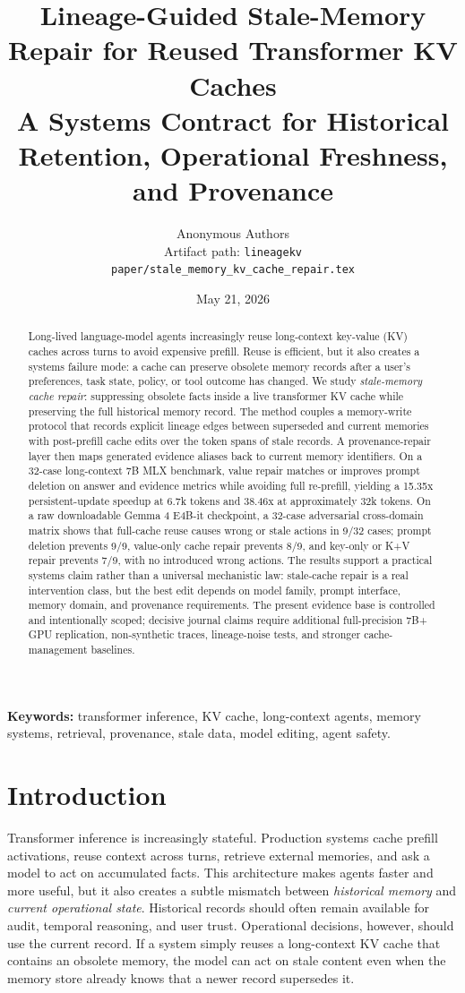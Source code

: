 \documentclass[11pt]{article}
\title{\textbf{Lineage-Guided Stale-Memory Repair for Reused Transformer KV Caches}\\
\large A Systems Contract for Historical Retention, Operational Freshness, and Provenance}
\author{
Anonymous Authors\\
Artifact path: \texttt{lineagekv}\\
\texttt{paper/stale\_memory\_kv\_cache\_repair.tex}
}
\date{May 21, 2026}
\newcommand{\gemma}{Gemma 4 E4B-it}
\begin{document}
\maketitle

\begin{abstract}
Long-lived language-model agents increasingly reuse long-context key-value (KV)
caches across turns to avoid expensive prefill. Reuse is efficient, but it also
creates a systems failure mode: a cache can preserve obsolete memory records
after a user's preferences, task state, policy, or tool outcome has changed. We
study \emph{stale-memory cache repair}: suppressing obsolete facts inside a
live transformer KV cache while preserving the full historical memory record.
The method couples a memory-write protocol that records explicit lineage edges
between superseded and current memories with post-prefill cache edits over the
token spans of stale records. A provenance-repair layer then maps generated
evidence aliases back to current memory identifiers. On a 32-case long-context
7B MLX benchmark, value repair matches or improves prompt deletion on answer
and evidence metrics while avoiding full re-prefill, yielding a 15.35x
persistent-update speedup at 6.7k tokens and 38.46x at approximately 32k
tokens. On a raw downloadable \gemma{} checkpoint, a 32-case adversarial
cross-domain matrix shows that full-cache reuse causes wrong or stale actions
in 9/32 cases; prompt deletion prevents 9/9, value-only cache repair prevents
8/9, and key-only or K+V repair prevents 7/9, with no introduced wrong actions.
The results support a practical systems claim rather than a universal
mechanistic law: stale-cache repair is a real intervention class, but the best
edit depends on model family, prompt interface, memory domain, and provenance
requirements. The present evidence base is controlled and intentionally scoped;
decisive journal claims require additional full-precision 7B+ GPU replication,
non-synthetic traces, lineage-noise tests, and stronger cache-management
baselines.
\end{abstract}

\noindent\textbf{Keywords:} transformer inference, KV cache, long-context
agents, memory systems, retrieval, provenance, stale data, model editing,
agent safety.

\section{Introduction}

Transformer inference is increasingly stateful. Production systems cache
prefill activations, reuse context across turns, retrieve external memories,
and ask a model to act on accumulated facts. This architecture makes agents
faster and more useful, but it also creates a subtle mismatch between
\emph{historical memory} and \emph{current operational state}. Historical
records should often remain available for audit, temporal reasoning, and user
trust. Operational decisions, however, should use the current record. If a
system simply reuses a long-context KV cache that contains an obsolete memory,
the model can act on stale content even when the memory store already knows
that a newer record supersedes it.
\end{document}
